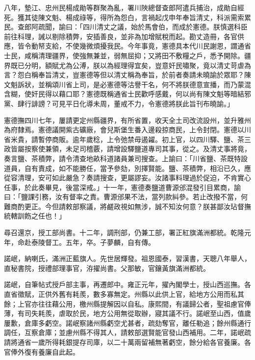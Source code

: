 \begin{pinyinscope}
八年，墊江、忠州民楊成勛等群聚為亂，署川陜總督查郎阿遣兵捕治，成勛自經死。獲其徒陳文魁、楊成祿等，得所為怨白，言禍起戊申年奉旨清丈，科派需索累民。查郎阿疏聞，諭曰：「四川清丈之議，始於馬會伯，而成於憲德。朕慎選科臣前往科理，誡以剔除積弊，安插善良，並非為加增賦稅而起。勘丈造冊，各官供應，皆令動帑支給，不使幾微煩擾我民。今年事竟，憲德具本代川民謝恩，謂通省士民，咸稱清理疆界，使強無兼並，弱無屈抑；又將田不敷糧之戶，悉予開除。疆界既已分明，額賦尤為公溥，朕以為經理得宜矣，豈意奸民嘯聚，竟以清丈苛虐為言？怨白稱奉旨清丈，豈憲德等但以清丈稱為奉旨，於前者奏請未曉諭於眾耶？陳文魁訴狀，並稱頌川省上司，是必憲德等沽譽干名，何不將朕德意宣播，而乃蒙混含糊，使奸民得以藉口耶？憲德既稱通省士民歡呼感戴，何以尚有陳文魁等暗結邪黨、肆行誹謗？可見平日化導未周，董戒不力，令憲德將朕此旨刊布曉諭。」

憲德撫四川七年，屢請更定州縣疆界，有所省置，收天全土司改流設州，並升雅州為府隸焉。憲德議開紫古礦廠，會兒斯堡生番入邊殺掠商民，上令封閉。憲德以川省米貴，請暫停商販。逾年歲稔，上令弛禁毋遏糴。初上官，以四川驛、鹽、茶三政皆屬按察使兼領，未足司稽覈，請增設驛鹽道專司其事，從之。及清丈事將竟，奏言鹽、茶積弊，請令清查地畝科道諸員兼司搜查。上諭曰：「川省鹽、茶既特設道員，自有責成，如不能勝任，當予參劾，別擇賢能。鹽、茶積弊，相沿已久，應從容清理，安可如此嚴急？奏請搜查，更屬謬妄。汝諸事料理過於促迫，不肯實心任事，於此奏畢見，後當深戒。」十一年，憲德奏鹽道曹源邠混發引目累商，諭曰：「鹽課引務，汝有督率之責。曹源邠果不法，當列款糾參。若止改撥不當，何難商酌更正。今但請敕部察議，將鹺政視如無涉，誠不知汝何意？朕甚鄙汝玷督撫統轄訓飭之任也！」

尋召還京，授工部尚書。十二年，調刑部，仍兼工部，署正紅旗滿洲都統。乾隆元年，命赴泰陵督工。五年，卒。子夢麟，自有傳。

諾岷，納喇氏，滿洲正藍旗人。先世居輝發。祖恩國泰，習漢書，天聰八年舉人，直秘書院，授禮部理事官，洊擢尚書。父那敏，官鑲黃旗滿洲都統。

諾岷，自筆帖式授戶部主事，再遷郎中。雍正元年，擢內閣學士，授山西巡撫。各直省徵賦，正供外舊有耗羨，數多寡無定。州縣以此供上官，給地方公用而私其餘；上官亦往往藉公用，檄州縣提解因以自私。康熙間，有議歸公者，聖祖慮官俸薄，有司失耗羨，虐取於民，地方公用無從取辦，寢其議不行。諾岷至山西，值歲屢歉，倉庫多虧空。諾岷察諸州縣虧空尤甚者，疏劾奪官，離任勒追；餘州縣通行調任，互察倉庫；並慮州縣不得其人，請敕部選賢能官發山西補用。二年，諾岷疏請將通省一歲所得耗銀提存司庫，以二十萬兩留補無著虧空，餘分給各官養廉。各官俸外復有養廉自此起。


\end{pinyinscope}
